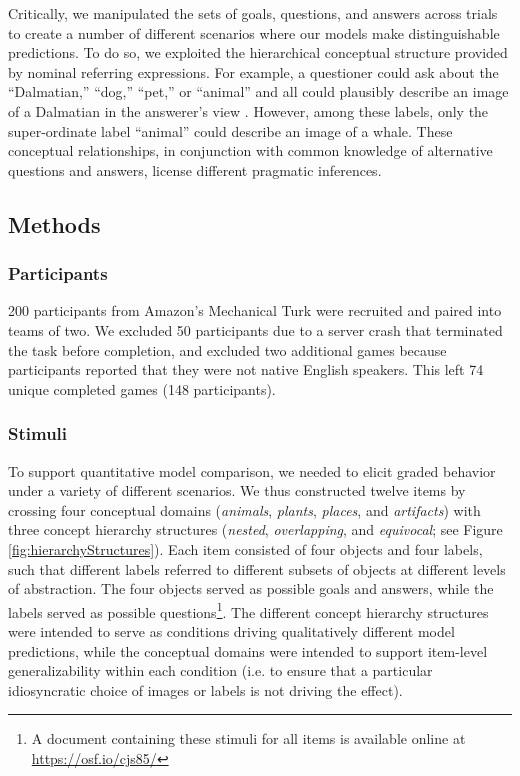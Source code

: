 \documentclass[11pt, floatsintext]{apa6}
\begin{document}
Critically, we manipulated the sets of goals, questions, and answers across trials to create a number of different scenarios where our models make distinguishable predictions.
To do so, we exploited the hierarchical conceptual structure provided by nominal referring expressions.
For example, a questioner could ask about the ``Dalmatian,'' ``dog,'' ``pet,'' or ``animal'' and all could plausibly describe an image of a Dalmatian in the answerer's view \cite{Brown58_HowShallAThingBeCalled,GrafEtAl16_BasicLevel}. 
However, among these labels, only the super-ordinate label ``animal'' could describe an image of a whale.
These conceptual relationships, in conjunction with common knowledge of alternative questions and answers, license different pragmatic inferences.



\subsection{Methods}
\subsubsection{Participants} 
200 participants from Amazon's Mechanical Turk were recruited and paired into teams of two.
We excluded 50 participants due to a server crash that terminated the task before completion, and
excluded two additional games because participants reported that they were not native English speakers. 
This left 74 unique completed games (148 participants).

\subsubsection{Stimuli} 

To support quantitative model comparison, we needed to elicit graded behavior under a variety of different scenarios.
We thus constructed twelve items by crossing four conceptual domains (\emph{animals}, \emph{plants}, \emph{places}, and \emph{artifacts}) with three concept hierarchy structures (\emph{nested}, \emph{overlapping}, and \emph{equivocal}; see Figure \ref{fig:hierarchyStructures}).
Each item consisted of four objects and four labels, such that different labels referred to different subsets of objects at different levels of abstraction. 
The four objects served as possible goals and answers, while the labels served as possible questions\footnote{A document containing these stimuli for all items is available online at \scriptsize\url{https://osf.io/cjs85/}}.
The different concept hierarchy structures were intended to serve as conditions driving qualitatively different model predictions, while the conceptual domains were intended to support item-level generalizability within each condition (i.e. to ensure that a particular idiosyncratic choice of images or labels is not driving the effect).
\end{document}
